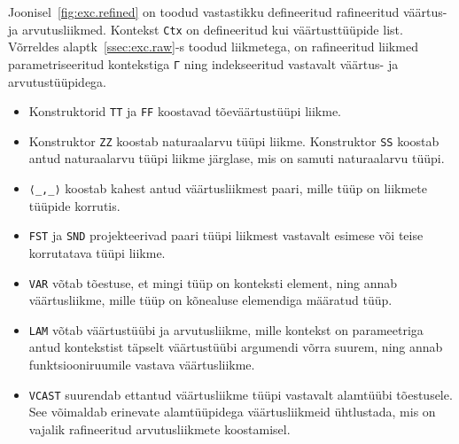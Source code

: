 \documentclass[a4paper,12pt]{article}
\begin{document}
Joonisel~\ref{fig:exc.refined} on toodud vastastikku defineeritud rafineeritud väärtus- ja arvutusliikmed.
Kontekst {\tt Ctx} on defineeritud kui väärtusttüüpide list.
Võrreldes alaptk~\ref{ssec:exc.raw}-s toodud liikmetega, on rafineeritud liikmed parametriseeritud kontekstiga {\tt Γ} ning indekseeritud vastavalt väärtus- ja arvutustüüpidega.
\begin{itemize}
\item Konstruktorid {\tt TT} ja {\tt FF} koostavad tõeväärtustüüpi liikme.
\item Konstruktor {\tt ZZ} koostab naturaalarvu tüüpi liikme. Konstruktor {\tt SS} koostab antud naturaalarvu tüüpi liikme järglase, mis on samuti naturaalarvu tüüpi.
\item {\tt ⟨_,_⟩} koostab kahest antud väärtusliikmest paari, mille tüüp on liikmete tüüpide korrutis.
\item {\tt FST} ja {\tt SND} projekteerivad paari tüüpi liikmest vastavalt esimese või teise korrutatava tüüpi liikme.
\item {\tt VAR} võtab tõestuse, et mingi tüüp on konteksti element, ning annab väärtusliikme, mille tüüp on kõnealuse elemendiga määratud tüüp.
\item {\tt LAM} võtab väärtustüübi ja arvutusliikme, mille kontekst on parameetriga antud kontekstist täpselt väärtustüübi argumendi võrra suurem, ning annab funktsiooniruumile vastava väärtusliikme.
\item {\tt VCAST} suurendab ettantud väärtusliikme tüüpi vastavalt alamtüübi tõestusele. See võimaldab erinevate alamtüüpidega väärtusliikmeid ühtlustada, mis on vajalik rafineeritud arvutusliikmete koostamisel.
\end{itemize}
\end{document}
